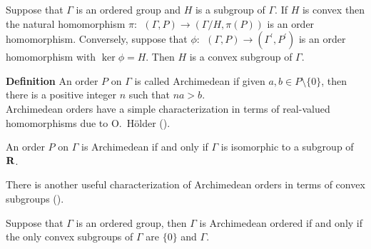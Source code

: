 \begin{theorem1}
Suppose that $\Gamma$ is an ordered group and 
$H$ is a subgroup of $\Gamma$.  If $H$ is convex 
then the natural homomorphism $\pi : \ \ 
(\Gamma,P) \rightarrow (\Gamma/ H,\pi(P))$ is 
an order homomorphism.  Conversely, suppose that
$\phi : \ \ 
(\Gamma,P) \rightarrow (\Gamma^\prime,P^\prime)$ 
is an order homomorphism with $\ker \phi= H$.  Then $H$ is a
convex subgroup of $\Gamma$.  
\label{theorem1}
\end{theorem1}
{\bf Definition}  An order $P$ on $\Gamma$ is called 
Archimedean if
 given $a,b\in P\setminus \{0\}$, then there is 
 a positive 
 integer $n$ such that $na>b$.\\

 Archimedean orders have a simple characterization
 in terms of real-valued homomorphisms 
 due to O.\ H\"{o}lder
 (\cite[Theorem 1, p. 45]{fu}).

\begin{archimedean}
An order $P$ on $\Gamma$ is Archimedean 
if and only if $\Gamma$ is isomorphic to a subgroup of $\R$.
\label{archimedean}
\end{archimedean}
There is another useful characterization of 
Archimedean orders in terms of convex subgroups 
(\cite[Corollary 5, p.\ 47]{fu}).


\begin{theorem2}
Suppose that $\Gamma$ is an ordered group, 
then $\Gamma$ is Archimedean ordered 
if and only if the only convex subgroups 
of $\Gamma$ are $\{0\}$ and $\Gamma$.
\label{theorem2}
\end{theorem2}

